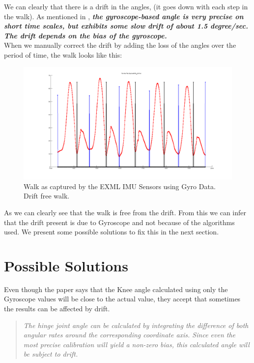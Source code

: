 \documentclass[12pt]{article}
\begin{document}
We can clearly that there is a drift in the angles, (it goes down with each step in the walk). As mentioned in \cite{s140406891},\textit{\textbf{ the gyroscope-based angle is very precise on short time scales, but exhibits some slow drift of about 1.5 degree/sec. The drift depends on the bias of the gyroscope.
}}\\

When we manually correct the drift by adding the loss of the angles over the period of time, the walk looks like this:
\begin{figure}[!htb]
\includegraphics[scale=.3,center]{driftFreeSteps.png}
\caption{Walk as captured by the EXML IMU Sensors using Gyro Data. Drift free walk.}
\label{diffproject}
\end{figure}

As we can clearly see that the walk is free from the drift. From this we can infer that the drift present is due to Gyroscope and not because of the algorithms used. We present some possible solutions to fix this in the next section.
\FloatBarrier

\section*{Possible Solutions}

Even though the paper says that the Knee angle calculated using only the Gyroscope values will be close to the actual value, they accept that sometimes the results can be affected by drift.\\

\begin{quote}
\textit{The hinge joint angle can be calculated by integrating the difference of both angular rates around the corresponding coordinate axis. Since even the most precise calibration will yield a non-zero bias, this calculated angle will be subject to drift.}
\end{quote}
\end{document}
